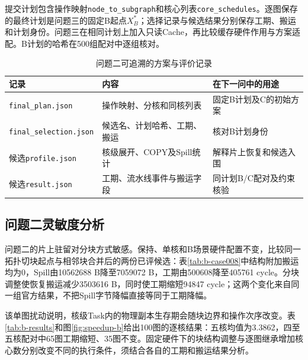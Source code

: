 提交计划包含操作映射\texttt{node\_to\_subgraph}和核心列表\texttt{core\_schedules}。逐图保存的最终计划是问题三的固定B起点$X_B^*$；选择记录与候选结果分别保存工期、搬运和计划身份。问题三在相同计划上加入只读Cache，再比较缓存硬件作用与方案适配。B计划的哈希在500组配对中逐组核对。

\begin{table}[H]\centering\small\caption{问题二可追溯的方案与评价记录}\label{tab:b-artifacts}
\begin{tabularx}{\linewidth}{lYY}\toprule
记录 & 内容 & 在下一问中的用途\\\midrule
\texttt{final\_plan.json} & 操作映射、分核和同核列表 & 固定B计划及C的初始方案\\
\texttt{final\_selection.json} & 候选名、计划哈希、工期、搬运 & 核对B计划身份\\
候选\texttt{profile.json} & 核级展开、COPY及Spill统计 & 解释片上恢复和候选入围\\
候选\texttt{result.json} & 工期、流水线事件与搬运字段 & 同计划B/C配对及约束核验\\\bottomrule
\end{tabularx}\end{table}

\subsection{问题二灵敏度分析}
问题二的片上驻留对分块方式敏感。保持、单核和B场景硬件配置不变，比较同一拓扑切块起点与相邻块合并后的两份已评候选：表\ref{tab:b-case008}中结构附加搬运均为0，Spill由10562688 B降至7059072 B，工期由500608降至405761 cycle。分块调整使恢复搬运减少3503616 B，同时使工期缩短94847 cycle；这两个变化来自同一组官方结果，不把Spill字节降幅直接等同于工期降幅。

该单图扰动说明，核级Task内的物理副本生存期会随块边界和操作次序改变。表\ref{tab:b-results}和图\ref{fig:speedup-b}给出100图的逐核结果：五核均值为3.3862，四至五核配对中65图工期缩短、35图不变。固定硬件下的块结构调整与逐图继承增加核心数分别改变不同的执行条件，须结合各自的工期和搬运结果分析。
